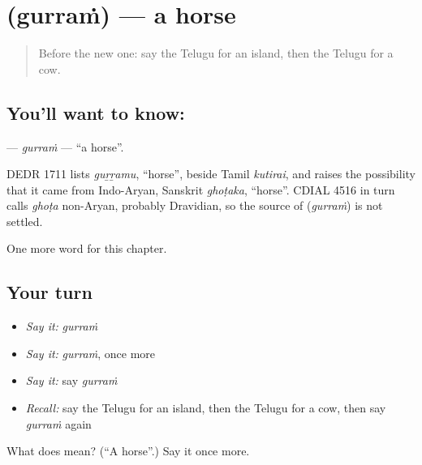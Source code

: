 \section[\texorpdfstring{\te{గుర్రం} (gurraṁ)}{గుర్రం (gurraṁ)}]{ (gurraṁ) — a horse}

\label{lesson:TE-C122-gurram}



\begin{quote}
Before the new one: say the Telugu for an island, then the Telugu for a cow.
\end{quote}

\subsection*{You'll want to know: }
\textbf{} — \emph{gurraṁ} — \textquotedblleft{}a horse\textquotedblright{}.

\begin{cousinweb}
DEDR 1711 lists \emph{guṟṟamu}, \textquotedblleft{}horse\textquotedblright{}, beside Tamil \emph{kutirai}, and raises the possibility that it came from Indo-Aryan, Sanskrit \emph{ghoṭaka}, \textquotedblleft{}horse\textquotedblright{}. CDIAL 4516 in turn calls \emph{ghoṭa} non-Aryan, probably Dravidian, so the source of \textbf{} (\emph{gurraṁ}) is not settled.
\end{cousinweb}

\begin{grammarlens}[title={What you've built}]
One more word for this chapter.
\end{grammarlens}

\subsection*{Your turn}
\begin{itemize}
\raggedright
  \item \emph{Say it:} \emph{gurraṁ}
  \item \emph{Say it:} \emph{gurraṁ}, once more
  \item \emph{Say it:} say \emph{gurraṁ}
  \item \emph{Recall:} say the Telugu for an island, then the Telugu for a cow, then say \emph{gurraṁ} again
\end{itemize}

\begin{tcolorbox}[breakable,colback=teal!4,colframe=teal!35!black,title={Before you move on}]
What does  mean? (\textquotedblleft{}A horse\textquotedblright{}.) Say it once more.
\end{tcolorbox}
